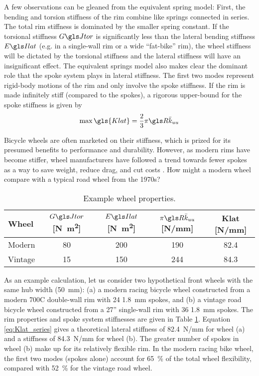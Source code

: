 \documentclass[\rootdir/thesis.tex]{subfiles}
\begin{document}
A few observations can be gleaned from the equivalent spring model: First, the bending and torsion stiffness of the rim combine like springs connected in series. The total rim stiffness is dominated by the smaller spring constant. If the torsional stiffness $\GJ$ is significantly less than the lateral bending stiffness $\EIl$ (e.g. in a single-wall rim or a wide ``fat-bike'' rim), the wheel stiffness will be dictated by the torsional stiffness and the lateral stiffness will have an insignificant effect. The equivalent springs model also makes clear the dominant role that the spoke system plays in lateral stiffness. The first two modes represent rigid-body motions of the rim and only involve the spoke stiffness. If the rim is made infinitely stiff (compared to the spokes), a rigorous upper-bound for the spoke stiffness is given by
\begin{equation}
\label{eq:Klat_stiff_rim}
\max{\gls{Klat}} = \frac{2}{3} \pi \R \kuu
\end{equation}

Bicycle wheels are often marketed on their stiffness, which is prized for its presumed benefits to performance and durability. However, as modern rims have become stiffer, wheel manufacturers have followed a trend towards fewer spokes as a way to save weight, reduce drag, and cut costs \cite{Brown2011}. How might a modern wheel compare with a typical road wheel from the 1970s?

\begin{table}[h]
\begin{threeparttable}
\caption[Example lateral stiffness properties]{Example wheel properties.\label{tab:wheels}}
\begin{tabular}{lcccc}
\toprule
\bf{Wheel} & $\GJ$ [\si{N.m^2}]& $\EIl$ [\si{N.m^2}] & $\pi\R\kuu$ [\si{N/mm}] & \gls{Klat} [\si{N/mm}]\\
\midrule
Modern  & 80 & 200 & 190 & 82.4\\
Vintage & 15 & 150 & 244 & 84.3\\
\bottomrule
\end{tabular}
\end{threeparttable}
\end{table}

As an example calculation, let us consider two hypothetical front wheels with the same hub width (\SI{50}{mm}): (a) a modern racing bicycle wheel constructed from a modern 700C double-wall rim with 24 \SI{1.8}{mm} spokes, and (b) a vintage road bicycle wheel constructed from a 27'' single-wall rim with 36 \SI{1.8}{mm} spokes. The rim properties and spoke system stiffnesses are given in Table \ref{tab:wheels}. Equation \eqref{eq:Klat_series} gives a theoretical lateral stiffness of \SI{82.4}{N/mm} for wheel (a) and a stiffness of \SI{84.3}{N/mm} for wheel (b). The greater number of spokes in wheel (b) make up for its relatively flexible rim. In the modern racing bike wheel, the first two modes (spokes alone) account for \SI{65}{\percent} of the total wheel flexibility, compared with \SI{52}{\percent} for the vintage road wheel.
\end{document}
